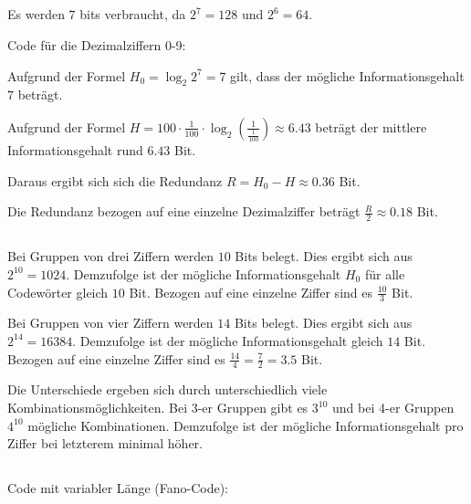 \documentclass[10pt,a4paper,oneside,ngerman,numbers=noenddot]{scrartcl}
\begin{document}
\subsection{} %
Es werden $7$ bits verbraucht, da $2^{7}=128$ und $2^{6}=64$.

Code für die Dezimalziffern 0-9:


Aufgrund der Formel $H_{0}=\log_{2}{2^{7}}=7$ gilt, dass der mögliche Informationsgehalt $7$ beträgt.

Aufgrund der Formel $H = 100 \cdot \frac{1}{100} \cdot \log_{2}{(\frac{1}{\frac{1}{100}})} \approx 6.43$ beträgt der mittlere Informationsgehalt rund $6.43$ Bit.

Daraus ergibt sich sich die Redundanz $R = H_{0} - H \approx 0.36$ Bit.

Die Redundanz bezogen auf eine einzelne Dezimalziffer beträgt $\frac{R}{2} \approx 0.18$ Bit.
\subsection{} %
Bei Gruppen von drei Ziffern werden $10$ Bits belegt. Dies ergibt sich aus $2^{10} = 1024$.
Demzufolge ist der mögliche Informationsgehalt $H_{0}$ für alle Codewörter gleich $10$ Bit. Bezogen auf eine einzelne Ziffer sind es $\frac{10}{3}$ Bit. 

Bei Gruppen von vier Ziffern werden $14$ Bits belegt. Dies ergibt sich aus $2^{14}=16384$.
Demzufolge ist der mögliche Informationsgehalt gleich $14$ Bit. Bezogen auf eine einzelne Ziffer sind es $\frac{14}{4} = \frac{7}{2} = 3.5$ Bit.

Die Unterschiede ergeben sich durch unterschiedlich viele Kombinationsmöglichkeiten. Bei 3-er Gruppen gibt es $3^{10}$ und bei 4-er Gruppen $4^{10}$ mögliche Kombinationen. Demzufolge ist der mögliche Informationsgehalt pro Ziffer bei letzterem minimal höher.
\subsection{} %

Code mit variabler Länge (Fano-Code):
\end{document}
